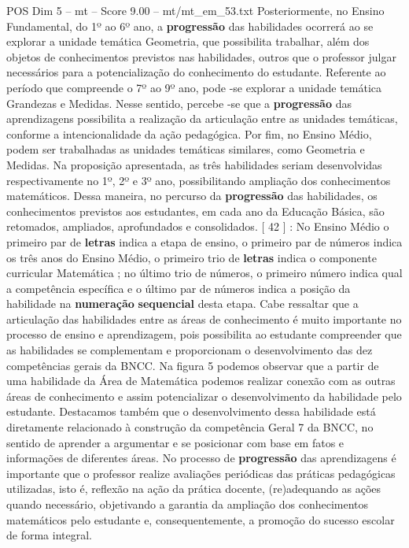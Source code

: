 \begin{textsample}{POS Dim 5 – mt – Score 9.00 – mt/mt\_em\_53.txt}
Posteriormente, no Ensino Fundamental, do 1º ao 6º ano, a \textbf{progressão} das habilidades ocorrerá ao se explorar a unidade temática Geometria, que possibilita trabalhar, além dos objetos de conhecimentos previstos nas habilidades, outros que o professor julgar necessários para a potencialização do conhecimento do estudante.
Referente ao período que compreende o 7º ao 9º ano, pode -se explorar a unidade temática Grandezas e Medidas.
Nesse sentido, percebe -se que a \textbf{progressão} das aprendizagens possibilita a realização da articulação entre as unidades temáticas, conforme a intencionalidade da ação pedagógica.
Por fim, no Ensino Médio, podem ser trabalhadas as unidades temáticas similares, como Geometria e Medidas.
Na proposição apresentada, as três habilidades seriam desenvolvidas respectivamente no 1º, 2º e 3º ano, possibilitando ampliação dos conhecimentos matemáticos.
Dessa maneira, no percurso da \textbf{progressão} das habilidades, os conhecimentos previstos aos estudantes, em cada ano da Educação Básica, são retomados, ampliados, aprofundados e consolidados. [ 42 ] : No Ensino Médio o primeiro par de \textbf{letras} indica a etapa de ensino, o primeiro par de números indica os três anos do Ensino Médio, o primeiro trio de \textbf{letras} indica o componente curricular Matemática ; no último trio de números, o primeiro número indica qual a competência específica e o último par de números indica a posição da habilidade na \textbf{numeração} \textbf{sequencial} desta etapa.
Cabe ressaltar que a articulação das habilidades entre as áreas de conhecimento é muito importante no processo de ensino e aprendizagem, pois possibilita ao estudante compreender que as habilidades se complementam e proporcionam o desenvolvimento das dez competências gerais da BNCC.
Na figura 5 podemos observar que a partir de uma habilidade da Área de Matemática podemos realizar conexão com as outras áreas de conhecimento e assim potencializar o desenvolvimento da habilidade pelo estudante.
Destacamos também que o desenvolvimento dessa habilidade está diretamente relacionado à construção da competência Geral 7 da BNCC, no sentido de aprender a argumentar e se posicionar com base em fatos e informações de diferentes áreas.
No processo de \textbf{progressão} das aprendizagens é importante que o professor realize avaliações periódicas das práticas pedagógicas utilizadas, isto é, reflexão na ação da prática docente, (re)adequando as ações quando necessário, objetivando a garantia da ampliação dos conhecimentos matemáticos pelo estudante e, consequentemente, a promoção do sucesso escolar de forma integral.

\end{textsample}
